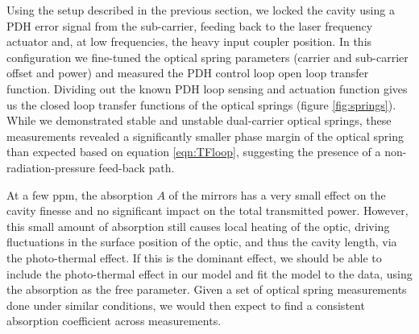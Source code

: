 
Using the setup described in the previous section, we locked the cavity using a PDH error signal from the sub-carrier, feeding back to the laser frequency actuator and, at low frequencies, the heavy input coupler position. In this configuration we fine-tuned the optical spring parameters (carrier and sub-carrier offset and power) and 
measured the PDH control loop open loop transfer function. Dividing out the known PDH loop sensing and actuation function gives us the closed loop transfer functions of the optical springs (figure \ref{fig:springs}). While we demonstrated stable and unstable dual-carrier optical springs, these measurements revealed a significantly smaller phase margin of the optical spring than expected based on equation \ref{eqn:TFloop}, suggesting the presence of a non-radiation-pressure feed-back path.

At a few ppm, the absorption $A$ of the mirrors has a very small effect on the cavity finesse and no significant impact on the total transmitted power. However, this small amount of absorption still causes local heating of the optic, driving fluctuations in the surface position of the optic, and thus the cavity length, via the photo-thermal effect. If this is the dominant effect, we should be able to include the photo-thermal effect in our model and fit the model to the data, using the absorption as the free parameter. Given a set of optical spring measurements done under similar conditions, we would then expect to find a consistent absorption coefficient across measurements.

